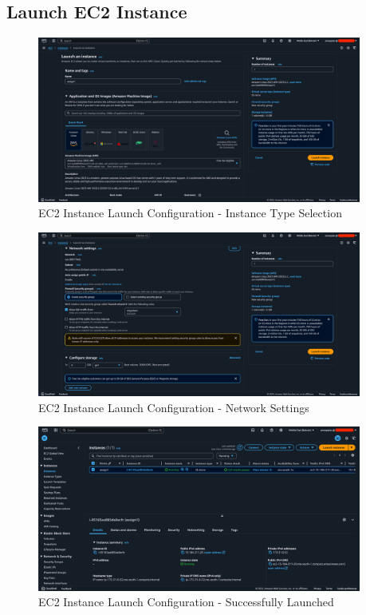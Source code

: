 \documentclass[a4paper,12pt]{article}
\begin{document}
\subsection{Launch EC2 Instance}

\begin{figure}[H]
    \centering
    \includegraphics[width=0.95\textwidth]{launch-instance-1.png}
    \caption{EC2 Instance Launch Configuration - Instance Type Selection}
    \label{fig:ec2-launch1}
\end{figure}

\begin{figure}[H]
    \centering
    \includegraphics[width=0.95\textwidth]{launch-instance-2.png}
    \caption{EC2 Instance Launch Configuration - Network Settings}
    \label{fig:ec2-launch2}
\end{figure}

\begin{figure}[H]
    \centering
    \includegraphics[width=0.95\textwidth]{launch-instance-3.png}
    \caption{EC2 Instance Launch Configuration - Successfully Launched}
    \label{fig:ec2-launch3}
\end{figure}
\end{document}
